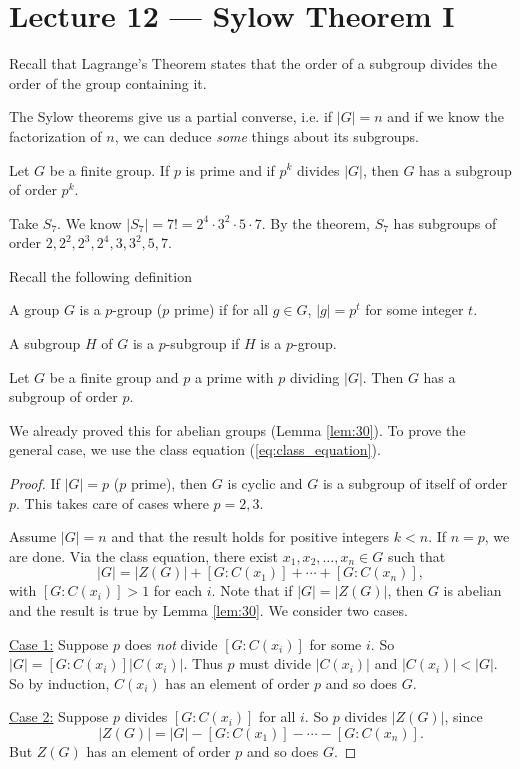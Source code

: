 \section{Lecture 12 — Sylow Theorem I}

Recall that Lagrange's Theorem states that the order of a subgroup divides the order of the group containing it.

The Sylow theorems give us a partial converse, i.e. if $|G|=n$ and if we know the factorization of $n$, we can deduce \textit{some} things about its subgroups.

\begin{theorem}\label{thm:sylow_1}
	Let $G$ be a finite group. If $p$ is prime and if $p^k$ divides $|G|$, then $G$ has a subgroup of order $p^k$.
\end{theorem}

\begin{example}
	Take $S_7$. We know $|S_7|=7!=2^4\cdot 3^2\cdot 5\cdot 7$. By the theorem, $S_7$ has subgroups of order $2,2^2,2^3,2^4,3,3^2,5,7$.
\end{example}

Recall the following definition

\begin{definition}
	A group $G$ is a $p$-group ($p$ prime) if for all $g\in G$, $|g|=p^t$ for some integer $t$.

	A subgroup $H$ of $G$ is a $p$-subgroup if $H$ is a $p$-group.
\end{definition}

\begin{theorem}[Cauchy]\label{thm:cauchy}
	Let $G$ be a finite group and $p$ a prime with $p$ dividing $|G|$. Then $G$ has a subgroup of order $p$.
\end{theorem}

We already proved this for abelian groups (Lemma \ref{lem:30}). To prove the general case, we use the class equation (\ref{eq:class_equation}).

\begin{proof}
	If $|G|=p$ ($p$ prime), then $G$ is cyclic and $G$ is a subgroup of itself of order $p$. This takes care of cases where $p=2,3$.

	Assume $|G|=n$ and that the result holds for positive integers $k<n$. If $n=p$, we are done. Via the class equation, there exist $x_1,x_2,\hdots, x_n\in G$ such that
	$$|G|=|Z(G)|+[G:C(x_1)]+\cdots+[G:C(x_n)],$$
	with $[G:C(x_i)]>1$ for each $i$. Note that if $|G|=|Z(G)|$, then $G$ is abelian and the result is true by Lemma \ref{lem:30}. We consider two cases.

	\underline{Case 1:} Suppose $p$ does \textit{not} divide $[G:C(x_i)]$ for some $i$. So $|G|=[G:C(x_i)]|C(x_i)|$. Thus $p$ must divide $|C(x_i)|$ and $|C(x_i)|<|G|$. So by induction, $C(x_i)$ has an element of order $p$ and so does $G$.

	\underline{Case 2:} Suppose $p$ divides $[G:C(x_i)]$ for all $i$. So $p$ divides $|Z(G)|$, since
	$$|Z(G)|=|G|-[G:C(x_1)]-\cdots -[G:C(x_n)].$$
	But $Z(G)$ has an element of order $p$ and so does $G$.
\end{proof}

